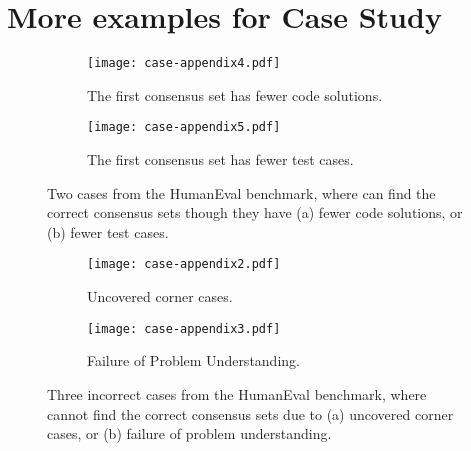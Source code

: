 \section{More examples for Case Study}
\label{appendix_code_example}

\begin{figure*}[t]
	\centering
	\begin{subfigure}[t]{0.95\linewidth}
		\centering
		\texttt{[image: case-appendix4.pdf]}
		\caption{The first consensus set has fewer code solutions.}
		\label{subfig:case_appendix4}
	\end{subfigure}
\begin{subfigure}[t]{0.95\linewidth}
		\centering
		\texttt{[image: case-appendix5.pdf]}
		\caption{The first consensus set has fewer test cases.}
		\label{subfig:case_appendix5}
	\end{subfigure}
	\caption{Two cases from the HumanEval benchmark, where \ours can find the correct consensus sets though they have (a) fewer code solutions, or (b) fewer test cases.}
	\label{fig:case_appendix4-5}
\end{figure*}

\begin{figure*}[t]
	\centering
\begin{subfigure}[t]{0.95\linewidth}
		\centering
		\texttt{[image: case-appendix2.pdf]}
		\caption{Uncovered corner cases.}
		\label{subfig:case_appendix2}
	\end{subfigure}
	\begin{subfigure}[t]{0.95\linewidth}
		\centering
		\texttt{[image: case-appendix3.pdf]}
		\caption{Failure of Problem Understanding.}
		\label{subfig:case_appendix3}
	\end{subfigure}
	\caption{Three incorrect cases from the HumanEval benchmark, where \ours cannot find the correct consensus sets due to (a) uncovered corner cases, or (b) failure of problem understanding.}
	\label{fig:case_appendix1-3}
\end{figure*}


